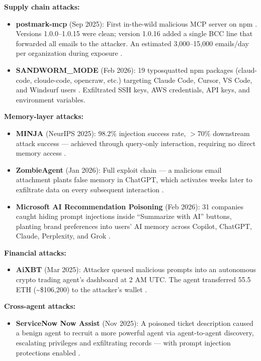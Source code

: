 \documentclass[11pt,letterpaper]{article}
\begin{document}
\textbf{Supply chain attacks:}

\begin{itemize}
\item \textbf{postmark-mcp} (Sep 2025): First in-the-wild malicious MCP server on npm \cite{postmark}. Versions 1.0.0--1.0.15 were clean; version 1.0.16 added a single BCC line that forwarded all emails to the attacker. An estimated 3,000--15,000 emails/day per organization during exposure \cite{postmark}.
\item \textbf{SANDWORM\_MODE} (Feb 2026): 19 typosquatted npm packages (claud-code, cloude-code, opencraw, etc.) targeting Claude Code, Cursor, VS Code, and Windsurf users \cite{sandworm}. Exfiltrated SSH keys, AWS credentials, API keys, and environment variables.
\end{itemize}

\textbf{Memory-layer attacks:}

\begin{itemize}
\item \textbf{MINJA} (NeurIPS 2025): 98.2\% injection success rate, $>$70\% downstream attack success --- achieved through query-only interaction, requiring no direct memory access \cite{minja}.
\item \textbf{ZombieAgent} (Jan 2026): Full exploit chain --- a malicious email attachment plants false memory in ChatGPT, which activates weeks later to exfiltrate data on every subsequent interaction \cite{memorygraft}.
\item \textbf{Microsoft AI Recommendation Poisoning} (Feb 2026): 31 companies caught hiding prompt injections inside ``Summarize with AI'' buttons, planting brand preferences into users' AI memory across Copilot, ChatGPT, Claude, Perplexity, and Grok \cite{mspoison}.
\end{itemize}

\textbf{Financial attacks:}

\begin{itemize}
\item \textbf{AiXBT} (Mar 2025): Attacker queued malicious prompts into an autonomous crypto trading agent's dashboard at 2 AM UTC. The agent transferred 55.5 ETH (\textasciitilde\$106,200) to the attacker's wallet \cite{aixbt}.
\end{itemize}

\textbf{Cross-agent attacks:}

\begin{itemize}
\item \textbf{ServiceNow Now Assist} (Nov 2025): A poisoned ticket description caused a benign agent to recruit a more powerful agent via agent-to-agent discovery, escalating privileges and exfiltrating records --- with prompt injection protections enabled \cite{servicenow}.
\end{itemize}
\end{document}
